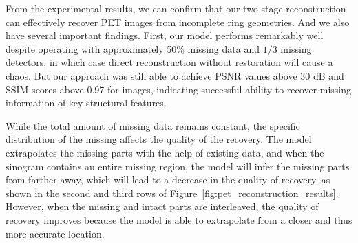 \documentclass[12pt]{iopart}
\begin{document}

From the experimental results, we can  confirm that our two-stage reconstruction can effectively recover  PET images from incomplete ring geometries. And we also have several important findings. 
First, our model performs remarkably well despite operating with approximately 50\% missing data and $1/3$ missing detectors, in which case direct reconstruction without restoration will cause a chaos. 
But our approach was still able to achieve PSNR values above 30 dB and SSIM scores above 0.97 for images, indicating successful ability to recover missing information of key structural features.

While the total amount of missing data remains constant, the specific distribution of the missing affects the quality of the recovery. The model extrapolates the missing parts with the help of existing data, and when the sinogram contains an entire missing region, the model will infer the missing parts from farther away, which will lead to a decrease in the quality of recovery, as shown in the second and third rows of Figure~\ref{fig:pet_reconstruction_results}. However, when the missing and intact parts are interleaved, the quality of recovery improves because the model is able to extrapolate from a closer and thus more accurate location. 
\end{document}
